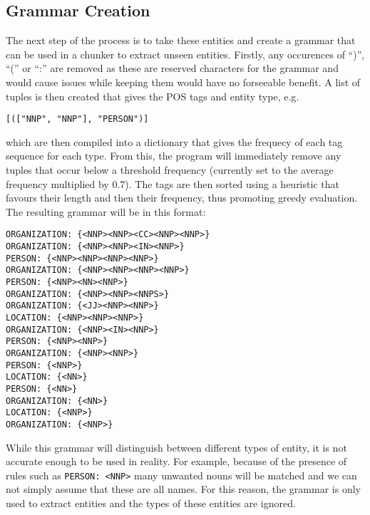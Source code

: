 \documentclass[draft]{article}
\begin{document}
\begin{multicols*}{2}
\section*{Grammar Creation}
The next step of the process is to take these entities and create a grammar that can be used in a chunker \citep{NLPChunker} to extract unseen entities. Firstly, any occurences of ``)'', ``('' or ``:'' are removed as these are reserved characters for the grammar and would cause issues while keeping them would have no forseeable benefit. A list of tuples is then created that gives the POS tags and entity type, e.g. \begin{verbatim}[(["NNP", "NNP"], "PERSON")]\end{verbatim} which are then compiled into a dictionary that gives the frequecy of each tag sequence for each type. From this, the program will immediately remove any tuples that occur below a threshold frequency (currently set to the average frequency multiplied by 0.7). The tags are then sorted using a heuristic that favours their length and then their frequency, thus promoting greedy evaluation. The resulting grammar will be in this format:
\begin{verbatim}
ORGANIZATION: {<NNP><NNP><CC><NNP><NNP>}
ORGANIZATION: {<NNP><NNP><IN><NNP>}
PERSON: {<NNP><NNP><NNP><NNP>}
ORGANIZATION: {<NNP><NNP><NNP><NNP>}
PERSON: {<NNP><NN><NNP>}
ORGANIZATION: {<NNP><NNP><NNPS>}
ORGANIZATION: {<JJ><NNP><NNP>}
LOCATION: {<NNP><NNP><NNP>}
ORGANIZATION: {<NNP><IN><NNP>}
PERSON: {<NNP><NNP>}
ORGANIZATION: {<NNP><NNP>}
PERSON: {<NNP>}
LOCATION: {<NN>}
PERSON: {<NN>}
ORGANIZATION: {<NN>}
LOCATION: {<NNP>}
ORGANIZATION: {<NNP>}
\end{verbatim}

While this grammar will distinguish between different types of entity, it is not accurate enough to be used in reality. For example, because of the presence of rules such as \texttt{PERSON: {<NNP>}} many unwanted nouns will be matched and we can not simply assume that these are all names. For this reason, the grammar is only used to extract entities and the types of these entities are ignored.


\end{multicols*}
\end{document}
